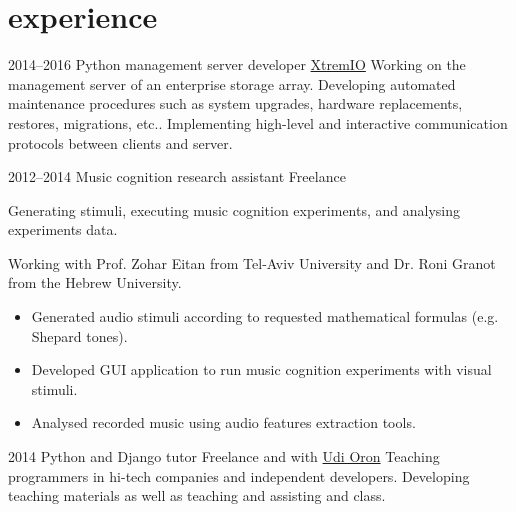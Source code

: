\documentclass[]{friggeri-cv}
\begin{document}

\section{experience}

\begin{entrylist}

    \entry
    {2014--2016}
    {Python management server developer}
    {\href{http://xtremio.com/}{XtremIO}}
    {
      Working on the management server of an enterprise storage array.
      Developing automated maintenance procedures such as system upgrades, hardware replacements, restores, migrations, etc..
      Implementing high-level and interactive communication protocols between clients and server.
    }

\end{entrylist}
\begin{entrylist}

    \entry
    {2012--2014}
    {Music cognition research assistant}
    {Freelance}
    {
      Generating stimuli, executing music cognition experiments, and analysing experiments data.

      Working with Prof. Zohar Eitan from Tel-Aviv University and Dr. Roni Granot from the Hebrew University.
      \begin{itemize}
        \item
          Generated audio stimuli according to requested mathematical formulas (e.g. Shepard tones).
        \item
          Developed GUI application to run music cognition experiments with visual stimuli.
        \item
          Analysed recorded music using audio features extraction tools.
      \end{itemize}
    }

\end{entrylist}
\begin{entrylist}

    \entry
    {2014}
    {Python and Django tutor}
    {Freelance and with \href{http://www.10x.org.il/}{Udi Oron}}
    {
      Teaching programmers in hi-tech companies and independent developers.
      Developing teaching materials as well as teaching and assisting and class.
    }

\end{entrylist}
\end{document}
